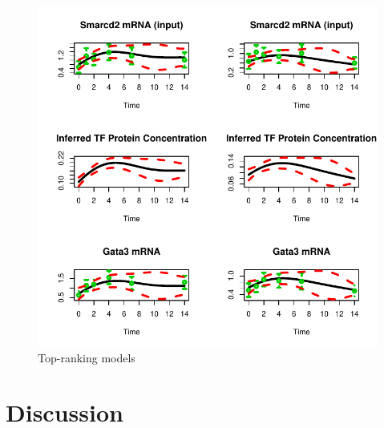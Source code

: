 \documentclass{article}
\begin{document}
\begin{figure}[htb]
  \centering
  \includegraphics[width=\columnwidth]{gpdisim_Smarcd2_Gata3}
  \caption{Top-ranking models}
  \label{fig:model5}
\end{figure}

\section{Discussion}



\end{document}

